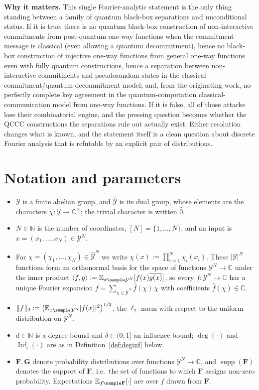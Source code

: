 \documentclass{conjura-conjecture}
\newcommand{\NN}{\mathbb{N}}
\newcommand{\CC}{\mathbb{C}}
\newcommand{\cY}{\mathcal{Y}}
\newcommand{\dY}{\widehat{\mathcal{Y}}}
\newcommand{\bF}{\mathbf{F}}
\newcommand{\bG}{\mathbf{G}}
\begin{document}
\textbf{Why it matters.} This single Fourier-analytic statement is the
only thing standing between a family of quantum black-box separations and
unconditional status. If it is true: there is no quantum black-box
construction of non-interactive commitments from post-quantum one-way
functions when the commitment message is classical (even allowing a
quantum decommitment), hence no black-box construction of injective
one-way functions from general one-way functions even with fully quantum
constructions, hence a separation between non-interactive commitments and
pseudorandom states in the classical-commitment/quantum-decommitment
model; and, from the originating work, no perfectly complete key
agreement in the quantum-computation classical-communication model from
one-way functions. If it is false, all of those attacks lose their
combinatorial engine, and the pressing question becomes whether the QCCC
constructions the separations rule out actually exist. Either resolution
changes what is known, and the statement itself is a clean question about
discrete Fourier analysis that is refutable by an explicit pair of
distributions.

\section{Notation and parameters}\label{sec:notation}

\begin{itemize}
  \item $\cY$ is a finite abelian group, and $\dY$ is its dual group,
  whose elements are the characters $\chi\colon\cY\to\CC^{\times}$; the
  trivial character is written $\hat{0}$.
  \item $N\in\NN$ is the number of coordinates, $[N]=\{1,\dots,N\}$, and
  an input is $x=(x_1,\dots,x_N)\in\cY^N$.
  \item For $\chi=(\chi_1,\dots,\chi_N)\in\dY^N$ we write
  $\chi(x):=\prod_{i=1}^{N}\chi_i(x_i)$. These $|\cY|^N$ functions form
  an orthonormal basis for the space of functions $\cY^N\to\CC$ under the
  inner product
  $\langle f,g\rangle:=\mathbb{E}_{x\sample\cY^N}[f(x)\overline{g(x)}]$,
  so every $f\colon\cY^N\to\CC$ has a unique Fourier expansion
  $f=\sum_{\chi\in\dY^N}\hat{f}(\chi)\,\chi$ with coefficients
  $\hat{f}(\chi)\in\CC$.
  \item $\lVert f\rVert_2 :=
  \bigl(\mathbb{E}_{x\sample\cY^N}\lvert f(x)\rvert^2\bigr)^{1/2}$, the
  $\ell_2$-norm with respect to the uniform distribution on $\cY^N$.
  \item $d\in\NN$ is a degree bound and $\delta\in(0,1]$ an influence
  bound; $\deg(\cdot)$ and $\operatorname{Inf}_i(\cdot)$ are as in
  Definition~\ref{def:deginf} below.
  \item $\bF,\bG$ denote probability distributions over functions
  $\cY^N\to\CC$, and $\operatorname{supp}(\bF)$ denotes the support of
  $\bF$, i.e.\ the set of functions to which $\bF$ assigns non-zero
  probability. Expectations $\mathbb{E}_{f\sample\bF}[\cdot]$ are over
  $f$ drawn from $\bF$.
\end{itemize}
\end{document}
